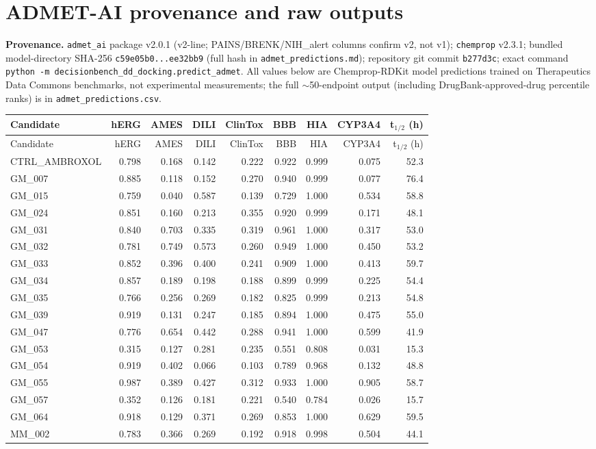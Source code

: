 \documentclass{article}
\begin{document}
\FloatBarrier
\section{ADMET-AI provenance and raw outputs}
\label{app:f}

\textbf{Provenance.} \texttt{admet\_ai} package v2.0.1 (v2-line; PAINS/BRENK/NIH\_alert columns confirm v2, not v1); \texttt{chemprop} v2.3.1; bundled model-directory SHA-256 \texttt{c59e05b0...ee32bb9} (full hash in \texttt{admet\_predictions.md}); repository git commit \texttt{b277d3c}; exact command \texttt{python -m decisionbench\_dd\_docking.predict\_admet}. All values below are Chemprop-RDKit model predictions trained on Therapeutics Data Commons benchmarks, not experimental measurements; the full $\sim$50-endpoint output (including DrugBank-approved-drug percentile ranks) is in \texttt{admet\_predictions.csv}.

\begin{longtable}{lrrrrrrrr}
\toprule
Candidate & hERG & AMES & DILI & ClinTox & BBB & HIA & CYP3A4 & t$_{1/2}$ (h) \\
\midrule
\endfirsthead
\toprule
Candidate & hERG & AMES & DILI & ClinTox & BBB & HIA & CYP3A4 & t$_{1/2}$ (h) \\
\midrule
\endhead
CTRL\_AMBROXOL & 0.798 & 0.168 & 0.142 & 0.222 & 0.922 & 0.999 & 0.075 & 52.3 \\
GM\_007 & 0.885 & 0.118 & 0.152 & 0.270 & 0.940 & 0.999 & 0.077 & 76.4 \\
GM\_015 & 0.759 & 0.040 & 0.587 & 0.139 & 0.729 & 1.000 & 0.534 & 58.8 \\
GM\_024 & 0.851 & 0.160 & 0.213 & 0.355 & 0.920 & 0.999 & 0.171 & 48.1 \\
GM\_031 & 0.840 & 0.703 & 0.335 & 0.319 & 0.961 & 1.000 & 0.317 & 53.0 \\
GM\_032 & 0.781 & 0.749 & 0.573 & 0.260 & 0.949 & 1.000 & 0.450 & 53.2 \\
GM\_033 & 0.852 & 0.396 & 0.400 & 0.241 & 0.909 & 1.000 & 0.413 & 59.7 \\
GM\_034 & 0.857 & 0.189 & 0.198 & 0.188 & 0.899 & 0.999 & 0.225 & 54.4 \\
GM\_035 & 0.766 & 0.256 & 0.269 & 0.182 & 0.825 & 0.999 & 0.213 & 54.8 \\
GM\_039 & 0.919 & 0.131 & 0.247 & 0.185 & 0.894 & 1.000 & 0.475 & 55.0 \\
GM\_047 & 0.776 & 0.654 & 0.442 & 0.288 & 0.941 & 1.000 & 0.599 & 41.9 \\
GM\_053 & 0.315 & 0.127 & 0.281 & 0.235 & 0.551 & 0.808 & 0.031 & 15.3 \\
GM\_054 & 0.919 & 0.402 & 0.066 & 0.103 & 0.789 & 0.968 & 0.132 & 48.8 \\
GM\_055 & 0.987 & 0.389 & 0.427 & 0.312 & 0.933 & 1.000 & 0.905 & 58.7 \\
GM\_057 & 0.352 & 0.126 & 0.181 & 0.221 & 0.540 & 0.784 & 0.026 & 15.7 \\
GM\_064 & 0.918 & 0.129 & 0.371 & 0.269 & 0.853 & 1.000 & 0.629 & 59.5 \\
MM\_002 & 0.783 & 0.366 & 0.269 & 0.192 & 0.918 & 0.998 & 0.504 & 44.1 \\
\bottomrule
\end{longtable}
\end{document}
